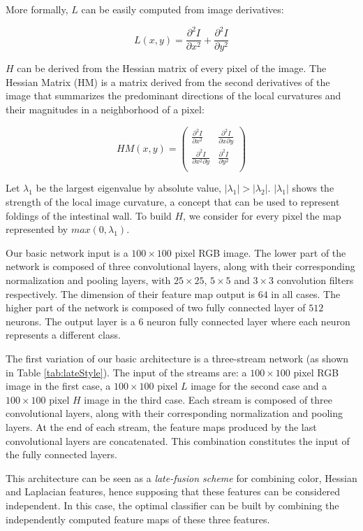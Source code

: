 \documentclass[review,12pt,3p]{elsarticle}
\begin{document}
More formally, $L$ can be easily computed from image derivatives:

$$ L(x,y) = \frac{\partial^2 I}{\partial x^2} +\frac{\partial^2 I}{\partial y^2} $$

$H$ can be derived from the Hessian matrix of every pixel of the image. The Hessian Matrix (HM) is a matrix derived from the second derivatives of the image that summarizes the predominant directions of the local curvatures and their magnitudes in a neighborhood of a pixel:

$$
HM(x,y) =
\left( \begin{array}{cc}
\frac{\partial^2 I}{\partial x^2} & \frac{\partial^2 I}{\partial x \partial y}  \\
\frac{\partial^2 I}{\partial x^2 \partial y} & \frac{\partial^2 I}{\partial y^2}  \\ \end{array} \right)
$$

Let $\lambda_1$ be the largest eigenvalue by absolute value, $|\lambda_1| > |\lambda_2|$. $|\lambda_1|$ shows the strength of the local image curvature, a concept that can be used to represent foldings of the intestinal wall. To build $H$,  we consider for
every pixel the map represented by $max(0, \lambda_1)$.

Our basic network input is a $100 \times 100$ pixel RGB image. The lower part of the network is composed of three convolutional layers, along with their corresponding normalization and pooling layers, with $25 \times 25$, $5 \times 5$ and $3 \times 3$ convolution filters respectively.  The dimension of their feature map output is $64$ in all cases. The higher part of the network is composed of two fully connected layer of $512$ neurons. The output layer is a $6$ neuron fully connected layer where each neuron represents a different class.

The first variation of our basic architecture is a three-stream network (as shown in Table \ref{tab:lateStyle}). The input of the streams are: a  $100 \times 100$ pixel RGB image in the first case, a $100 \times 100$ pixel $L$ image for the second case and a $100 \times 100$ pixel $H$ image in the third case. Each stream is composed of three convolutional layers, along with their corresponding normalization and pooling layers. At the end of each stream, the feature maps produced by the last convolutional layers are concatenated. This combination constitutes the input of the fully connected layers.

This architecture can be seen as a {\em late-fusion scheme} for combining color, Hessian and Laplacian features, hence supposing that these features can be considered independent. In this case, the optimal classifier can be built by combining the independently computed feature maps of these three features.
\end{document}
